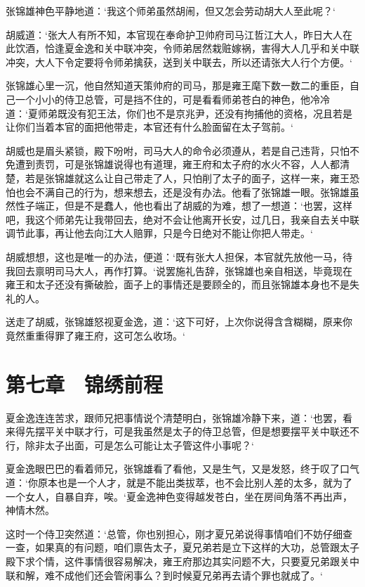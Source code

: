 张锦雄神色平静地道：‘我这个师弟虽然胡闹，但又怎会劳动胡大人至此呢？‘

胡威道：‘张大人有所不知，本官现在奉命护卫帅府司马江哲江大人，昨日大人在此饮酒，恰逢夏金逸和关中联冲突，令师弟居然栽赃嫁祸，害得大人几乎和关中联冲突，大人下令定要将令师弟擒获，送到关中联去，所以还请张大人行个方便。‘

张锦雄心里一沉，他自然知道天策帅府的司马，那是雍王麾下数一数二的重臣，自己一个小小的侍卫总管，可是挡不住的，可是看看师弟苍白的神色，他冷冷道：‘夏师弟既没有犯王法，你们也不是京兆尹，还没有拘捕他的资格，况且若是让你们当着本官的面把他带走，本官还有什么脸面留在太子驾前。‘

胡威也是眉头紧锁，殿下吩咐，司马大人的命令必须遵从，若是自己违背，只怕不免遭到责罚，可是张锦雄说得也有道理，雍王府和太子府的水火不容，人人都清楚，若是张锦雄就这么让自己带走了人，只怕削了太子的面子，这样一来，雍王恐怕也会不满自己的行为，想来想去，还是没有办法。他看了张锦雄一眼。张锦雄虽然性子端正，但是不是蠢人，他也看出了胡威的为难，想了一想道：‘也罢，这样吧，我这个师弟先让我带回去，绝对不会让他离开长安，过几日，我亲自去关中联调节此事，再让他去向江大人赔罪，只是今日绝对不能让你把人带走。‘

胡威想想，这也是唯一的办法，便道：‘既有张大人担保，本官就先放他一马，待我回去禀明司马大人，再作打算。‘说罢施礼告辞，张锦雄也亲自相送，毕竟现在雍王和太子还没有撕破脸，面子上的事情还是要顾全的，而且张锦雄本身也不是失礼的人。

送走了胡威，张锦雄怒视夏金逸，道：‘这下可好，上次你说得含含糊糊，原来你竟然重重得罪了雍王府，这可怎么收场。‘

\chapter{第七章　锦绣前程}

夏金逸连连苦求，跟师兄把事情说个清楚明白，张锦雄冷静下来，道：‘也罢，看来得先摆平关中联才行，可是我虽然是太子的侍卫总管，但是想要摆平关中联还不行，除非太子出面，可是怎么可能让太子管这件小事呢？‘

夏金逸眼巴巴的看着师兄，张锦雄看了看他，又是生气，又是发怒，终于叹了口气道：‘你原本也是一个人才，就是不能出类拔萃，也不会比别人差的太多，就为了一个女人，自暴自弃，唉。‘夏金逸神色变得越发苍白，坐在房间角落不再出声，神情木然。

这时一个侍卫突然道：‘总管，你也别担心，刚才夏兄弟说得事情咱们不妨仔细查一查，如果真的有问题，咱们禀告太子，夏兄弟若是立下这样的大功，总管跟太子殿下求个情，这件事情很容易解决，雍王府那边其实问题不大，只要夏兄弟跟关中联和解，难不成他们还会管闲事么？到时候夏兄弟再去请个罪也就成了。‘

